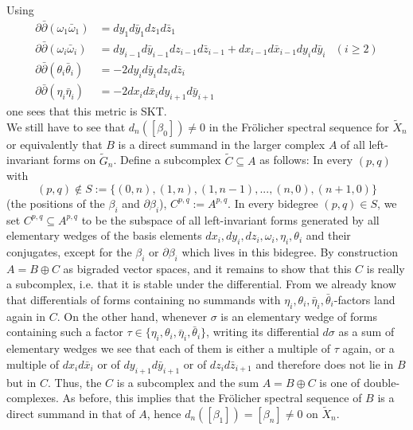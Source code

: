 \documentclass[12pt,reqno]{amsart}
\theoremstyle{definition}
\newcommand{\del}{\partial}
\newcommand{\delbar}{\bar{\del}}
\begin{document}
Using
\begin{align*}
\del\delbar(\omega_1\bar\omega_1)&=dy_1d\bar{y}_1dz_1d\bar{z}_1\\
\del\delbar(\omega_i\bar\omega_i)&=dy_{i-1}d\bar{y}_{i-1}dz_{i-1}d\bar{z}_{i-1}+dx_{i-1}d\bar{x}_{i-1}dy_id\bar{y}_i&(i\geq 2)\\
\del\delbar(\theta_i\bar\theta_i)&=-2dy_id\bar{y}_idz_id\bar{z}_i\\
\del\delbar(\eta_i\bar\eta_i)&=-2dx_{i}d\bar{x}_idy_{i+1}d\bar{y}_{i+1}
\end{align*}
one sees that this metric is SKT.\\

We still have to see that $d_n([\beta_0])\neq 0$ in the Fr\"olicher spectral sequence for $\tilde{X}_n$ or equivalently that $B$ is a direct summand in the larger complex $A$ of all left-invariant forms  on $\tilde{G}_n$. Define a subcomplex $\tilde{C}\subseteq A$ as follows: In every $(p,q)$ with 
\[(p,q)\notin S:=\{(0,n),(1,n),(1,n-1),...,(n,0),(n+1,0)\}
\]
(the positions of the $\beta_i$ and $\del\beta_i$), $C^{p,q}:=A^{p,q}$. In every bidegree $(p,q)\in S$, we set $C^{p,q}\subseteq A^{p,q}$ to be the subspace of all left-invariant forms generated by all elementary wedges of the basis elements $dx_i,dy_i,dz_i,\omega_i,\eta_i, \theta_i$ and their conjugates, except for the $\beta_i$ or $\del\beta_i$ which lives in this bidegree. By construction $A=B\oplus C$ as bigraded vector spaces, and it remains to show that this $C$ is really a subcomplex, i.e. that it is stable under the differential. 
From \cite{BR14} we already know that differentials of forms containing no summands with $\eta_i,\theta_i,\bar\eta_i,\bar\theta_i$-factors land again in $C$. On the other hand, whenever $\sigma$ is an elementary wedge of forms containing such a factor $\tau\in\{\eta_i,\theta_i,\bar\eta_i,\bar\theta_i\}$, writing its differential $d\sigma$ as a sum of elementary wedges we see that each of them is either a multiple of $\tau$ again, or a multiple of $dx_id\bar{x}_i$ or of $dy_{i+1}d\bar{y}_{i+1}$ or of $dz_id\bar{z}_{i+1}$ and therefore does not lie in $B$ but in $C$. Thus, the $C$ is a subcomplex and the sum $A=B\oplus C$ is one of double-complexes. As before, this implies that the Fr\"olicher spectral sequence of $B$ is a direct summand in that of $A$, hence $d_n([\beta_1])=[\beta_n]\neq 0$ on $\tilde{X}_n$.
\end{document}
